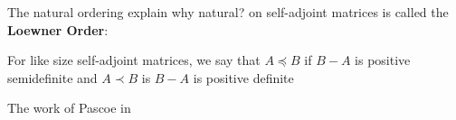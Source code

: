 The natural ordering {\color{red} {explain why natural?}} on self-adjoint
matrices is called the \textbf{Loewner Order}:

\begin{definition}
  For like size self-adjoint matrices, we say that \(A \preceq B\) if \(B - A \)
  is positive semidefinite and \(A \prec B\) is \(B-A\) is positive definite
\end{definition}

The work of Pascoe in

